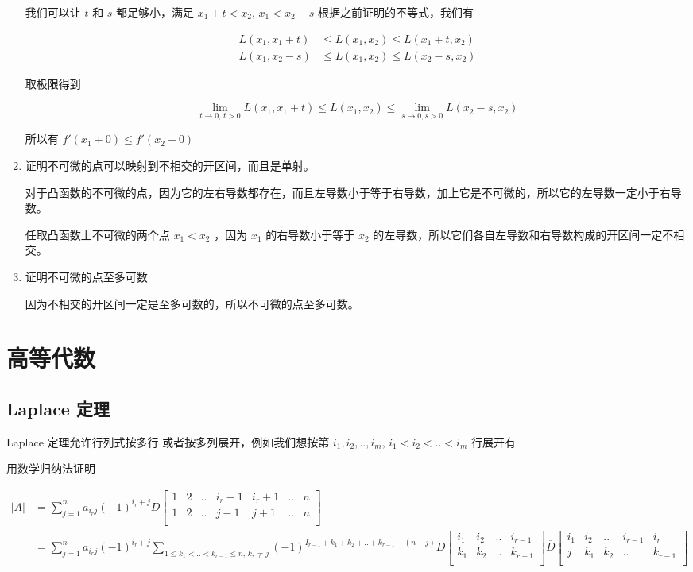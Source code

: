 \documentclass[12pt,a4paper]{ctexart}
\begin{document}
\begin{enumerate}
我们可以让 $t$ 和 $s$ 都足够小，满足 $x_1 +t < x_2,\, x_1 < x_2 -s$ 根据之前证明的不等式，我们有

\begin{align*}
    L(x_1, x_1 + t) &\le L(x_1, x_2) \le L(x_1+t, x_2) \\
    L(x_1, x_2-s) &\le L(x_1,x_2) \le L(x_2 -s, x_2)
\end{align*}

取极限得到

\[
\lim_{t \to 0,\,t>0}L(x_1, x_1 + t)\le L(x_1,x_2) \le \lim_{s \to 0, s>0}L(x_2 -s,x_2)
\]

所以有 $f'(x_1+0) \le f'(x_2 - 0)$

\item 证明不可微的点可以映射到不相交的开区间，而且是单射。

对于凸函数的不可微的点，因为它的左右导数都存在，而且左导数小于等于右导数，加上它是不可微的，所以它的左导数一定小于右导数。

任取凸函数上不可微的两个点 $x_1 < x_2$ ，因为 $x_1$ 的右导数小于等于 $x_2$ 的左导数，所以它们各自左导数和右导数构成的开区间一定不相交。

\item  证明不可微的点至多可数

因为不相交的开区间一定是至多可数的，所以不可微的点至多可数。

\end{enumerate}


\section{高等代数}

\subsection{Laplace 定理}

Laplace 定理允许行列式按多行 或者按多列展开，例如我们想按第 $i_1,i_2,..,i_m,\, i_1 < i_2 < .. < i_m$ 行展开有

用数学归纳法证明

\begin{align*}
    |A| &= \sum_{j=1}^{n}a_{i_r j}(-1)^{i_r + j} D \begin{bmatrix}
       1 & 2 & .. & i_r - 1 & i_r + 1 & .. & n \\  
       1 & 2 & .. & j - 1 & j + 1 & .. & n \\  
    \end{bmatrix} \\
    &= \sum_{j=1}^{n}a_{i_r j}(-1)^{i_r + j} 
    \sum_{1 \le k_1 < .. < k_{r-1} \le n,\, k_{*} \ne j}
    (-1)^{I_{r-1} + k_1 + k_2+ .. + k_{r-1}  - (n-j)} 
    D \begin{bmatrix}
        i_1 & i_2 & .. & i_{r-1} \\
        k_1 & k_2 & .. & k_{r-1} \\
    \end{bmatrix} \overline{D} \begin{bmatrix}
        i_1 & i_2 & .. & i_{r-1} & i_r \\
        j & k_1 & k_2 & .. & k_{r-1} \\
    \end{bmatrix}
\end{align*}
\end{document}
